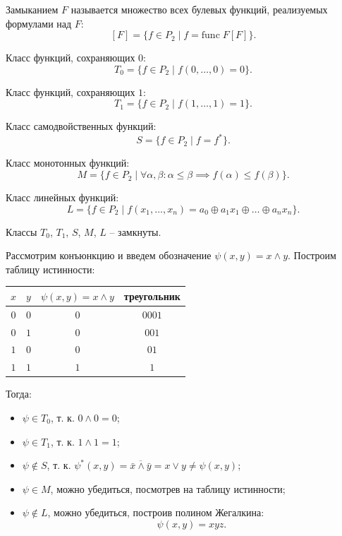 Замыканием \(F\) называется множество всех булевых функций, реализуемых формулами над \(F\):
\[
    [F] = \{f \in P_2 \mid f = \text{func} \; F [F]\}.
\]

Класс функций, сохраняющих \(0\):
\[
    T_0 = \{f \in P_2 \mid f(0, \ldots, 0) = 0\}.
\]

Класс функций, сохраняющих \(1\):
\[
    T_1 = \{f \in P_2 \mid f(1, \ldots, 1) = 1\}.
\]

Класс самодвойственных функций:
\[
    S = \{f \in P_2 \mid f = f^*\}.
\]

Класс монотонных функций:
\[
    M = \{f \in P_2 \mid \forall \alpha, \beta : \alpha \leq \beta \implies f(\alpha) \leq f(\beta)\}.
\]

Класс линейных функций:
\[
    L = \{f \in P_2 \mid f(x_1, \ldots, x_n) = a_0 \oplus a_1 x_1 \oplus \ldots \oplus a_n x_n\}.
\]

\begin{theorem*}
    Классы \(T_0\), \(T_1\), \(S\), \(M\), \(L\) -- замкнуты.
\end{theorem*}

\begin{example*}
    Рассмотрим конъюнкцию и введем обозначение \(\psi(x, y) = x \land y\). Построим таблицу истинности:
    {
    \renewcommand*{\arraystretch}{1.5}
    \begin{longtable}{|c|c|c|c|}
        \hline
        \(x\) & \(y\) & \(\psi(x, y) = x \land y\) & треугольник \\
        \hline
        \(0\) & \(0\) & \(0\)                      & \(0001\)    \\
        \hline
        \(0\) & \(1\) & \(0\)                      & \(001\)     \\
        \hline
        \(1\) & \(0\) & \(0\)                      & \(01\)      \\
        \hline
        \(1\) & \(1\) & \(1\)                      & \(1\)       \\
        \hline
    \end{longtable}
    }
    Тогда:
    \begin{itemize}
        \item \(\psi \in T_0\), т. к. \(0 \land 0 = 0\);
        \item \(\psi \in T_1\), т. к. \(1 \land 1 = 1\);
        \item \(\psi \notin S\), т. к. \(\psi^*(x, y) = \overline{\bar{x} \land \bar{y}} = x \lor y \neq \psi(x, y)\);
        \item \(\psi \in M\), можно убедиться, посмотрев на таблицу истинности;
        \item \(\psi \notin L\), можно убедиться, построив полином Жегалкина:
              \[
                  \psi(x, y) = xyz.
              \]
    \end{itemize}
\end{example*}


